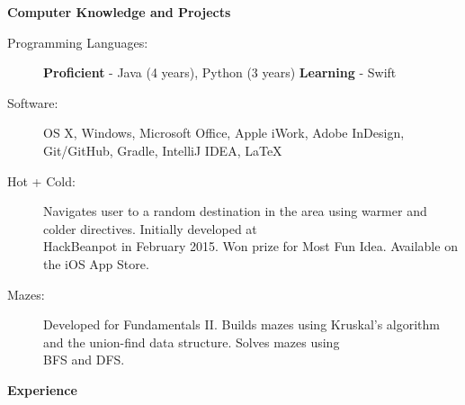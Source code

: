 \documentclass[letterpaper,10.6pt]{article}
\newcommand{\resheading}[1]{{\large \colorbox{mygrey}{\begin{minipage}{\textwidth}{\textbf{#1 \vphantom{p\^{E}}}}\end{minipage}}}}
\begin{document}
\resheading{Computer Knowledge and Projects}
{\small
\begin{description}
	\item[Programming Languages:] {\footnotesize \textbf{Proficient} - Java (4 years), Python (3 years) \enspace \textbf{Learning} - Swift}
	\item[Software:] {\footnotesize OS X, Windows, Microsoft Office, Apple iWork, Adobe InDesign, Git/GitHub, Gradle, IntelliJ IDEA, \LaTeX}
	\item[Hot + Cold:] {\footnotesize Navigates user to a random destination in the area using warmer and colder directives. Initially developed at \\ \hspace{1.31cm}HackBeanpot in February 2015. Won prize for Most Fun Idea. Available on the iOS App Store.}
	\item[Mazes:] {\footnotesize Developed for Fundamentals II. Builds mazes using Kruskal's algorithm and the union-find data structure. Solves mazes using \\ \hspace{0.41cm}BFS and DFS.}
	
\end{description}
}
\resheading{Experience}
\end{document}
